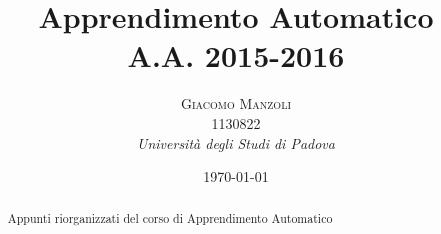 \documentclass[a4paper, 11pt]{article} %
\title{\textbf{Apprendimento Automatico}\\ %
A.A. 2015-2016} %
\author{\textsc{Giacomo Manzoli}
\\ 1130822 %
\\{\textit{Università degli Studi di Padova}}} %
\date{\today} %
\makeatletter
\renewcommand{\maketitle}{ %
\begin{flushright} %
{\LARGE\@title} %

\vspace{50pt} %

{\large\@author} %
\\\@date %

\vspace{100pt} %
\end{flushright}
}
\makeatother
\begin{document}
\maketitle %



\begin{abstract}
Appunti riorganizzati del corso di Apprendimento Automatico

\end{abstract}

\clearpage
\tableofcontents


\vspace{30pt} %

\clearpage























%
%
\end{document}
